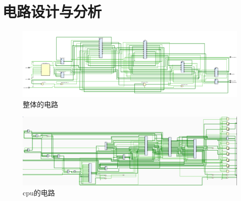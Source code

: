 \documentclass[12pt,a4paper]{ctexart}
\begin{document}
\section{电路设计与分析}
\begin{figure}[H]
    \centering
    \includegraphics[scale=0.4]{pic/整体.png}
    \caption{整体的电路}
\end{figure}
\begin{figure}[H]
    \centering
    \includegraphics[scale=0.4]{pic/cpu.png}
    \caption{cpu的电路}
\end{figure}
\end{document}
